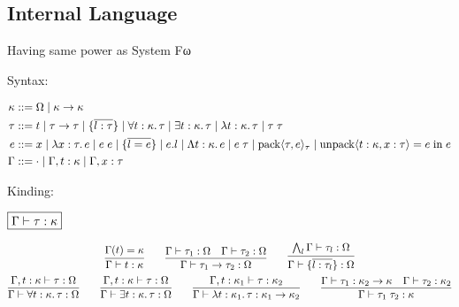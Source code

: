 \subsection{Internal Language}

Having same power as System Fω

Syntax:

\begin{align*}
  \kappa
  &\mathrel{::=} \Omega \mid \kappa \to \kappa
  \\
  \tau
  &\mathrel{::=} t
  \mid \tau \to \tau
  \mid \{\overline{l: \tau}\}
  \mid \forall t: \kappa\ldotp \tau
  \mid \exists t: \kappa\ldotp \tau
  \mid \lambda t: \kappa\ldotp \tau
  \mid \tau\; \tau
  \\
  e
  &\mathrel{::=} x
  \mid \lambda x: \tau\ldotp e
  \mid e\; e
  \mid \{\overline{l = e}\}
  \mid e . l
  \mid \Lambda t: \kappa\ldotp e
  \mid e\; \tau
  \mid \mathop{\mathrm{pack}} \langle \tau, e\rangle_\tau
  \mid \mathop{\mathrm{unpack}} \langle t: \kappa, x: \tau\rangle = e \mathrel{\mathrm{in}} e
  \\
  \Gamma
  &\mathrel{::=} \cdot
  \mid \Gamma, t: \kappa
  \mid \Gamma, x: \tau
\end{align*}

Kinding:

$\fbox{$\Gamma \vdash \tau: \kappa$}$

\begin{gather*}
  \infer{\Gamma \vdash t: \kappa}{
    \Gamma(t) = \kappa
  }
  \hspace{2em}
  \infer{\Gamma \vdash \tau_1 \to \tau_2: \Omega}{
    \Gamma \vdash \tau_1: \Omega
    &
    \Gamma \vdash \tau_2: \Omega
  }
  \hspace{2em}
  \infer{\Gamma \vdash \{\overline{l: \tau_l}\}: \Omega}{
    \bigwedge_l \Gamma \vdash \tau_l: \Omega
  }
  \\
  \infer{\Gamma \vdash \forall t: \kappa\ldotp \tau: \Omega}{
    \Gamma, t: \kappa \vdash \tau: \Omega
  }
  \hspace{2em}
  \infer{\Gamma \vdash \exists t: \kappa\ldotp \tau: \Omega}{
    \Gamma, t: \kappa \vdash \tau: \Omega
  }
  \hspace{2em}
  \infer{\Gamma \vdash \lambda t: \kappa_1\ldotp \tau: \kappa_1 \to \kappa_2}{
    \Gamma, t: \kappa_1 \vdash \tau: \kappa_2
  }
  \hspace{2em}
  \infer{\Gamma \vdash \tau_1\; \tau_2: \kappa}{
    \Gamma \vdash \tau_1: \kappa_2 \to \kappa
    &
    \Gamma \vdash \tau_2: \kappa_2
  }
\end{gather*}

